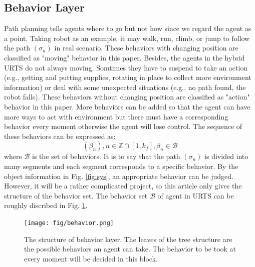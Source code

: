 \documentclass{ieeeaccess}
\begin{document}
\subsection{Behavior Layer}
Path planning tells agents where to go but not how since we regard the agent as a point. Taking robot as an example, it may walk, run, climb, or jump to follow the path $(\sigma_n)$ in real scenario. These behaviors with changing position are classified as "moving" behavior in this paper. Besides, the agents in the hybrid URTS do not always moving. Somtimes they have to suspend to take an action (e.g., getting and putting supplies, rotating in place to collect more environment information) or deal with some unexpected situations (e.g., no path found, the robot falls). These behaviors without changing position are classified as "action" behavior in this paper. More behaviors can be added so that the agent can have more ways to act with environment but there must have a corresponding behavior every moment otherwise the agent will lose control. The sequence of these behaviors can be expressed as:
\begin{equation}
    (\beta_n), n\in\mathbb{Z}\cap[1,k_f], \beta_n\in\mathcal{B}
\end{equation}
where $\mathcal{B}$ is the set of behaviors. It is to say that the path $(\sigma_n)$ is divided into many segments and each segment corresponds to a specific behavior. By the object information in Fig. \ref{fig:sys}, an appropriate behavior can be judged. However, it will be a rather complicated project, so this article only gives the structure of the behavior set. The behavior set $\mathcal{B}$ of agent in URTS can be roughly discribed in Fig. \ref{fig:behavior}.

\begin{figure}[htbp]
    \centering
    \texttt{[image: fig/behavior.png]}\caption{The structure of behavior layer. The leaves of the tree structure are the possible behaviors an agent can take. The behavior to be took at every moment will be decided in this block.}%
    \label{fig:behavior}
\end{figure}
\end{document}
